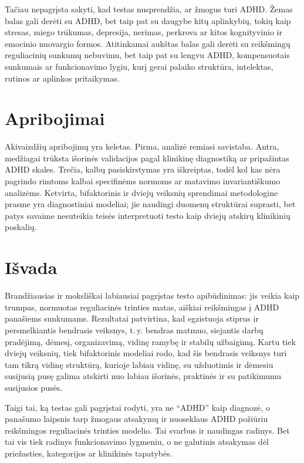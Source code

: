 \documentclass[11pt,a4paper]{article}
\begin{document}
Tačiau nepagrįsta sakyti, kad testas nusprendžia, ar žmogus turi ADHD. Žemas balas gali derėti su ADHD, bet taip pat su daugybe kitų aplinkybių, tokių kaip stresas, miego trūkumas, depresija, nerimas, perkrova ar kitos kognityvinio ir emocinio nuovargio formos. Atitinkamai aukštas balas gali derėti su reikšmingų reguliacinių sunkumų nebuvimu, bet taip pat su lengvu ADHD, kompensuotais sunkumais ar funkcionavimo lygiu, kurį gerai palaiko struktūra, intelektas, rutinos ar aplinkos pritaikymas.

\section{Apribojimai}
Akivaizdžių apribojimų yra keletas. Pirma, analizė remiasi savistaba. Antra, medžiagai trūksta išorinės validacijos pagal klinikinę diagnostiką ar pripažintas ADHD skales. Trečia, kalbų pasiskirstymas yra iškreiptas, todėl kol kas nėra pagrindo rimtoms kalbai specifinėms normoms ar matavimo invariantiškumo analizėms. Ketvirta, bifaktorinis ir dviejų veiksnių sprendimai metodologine prasme yra diagnostiniai modeliai; jie naudingi duomenų struktūrai suprasti, bet patys savaime nesuteikia teisės interpretuoti testo kaip dviejų atskirų klinikinių poskalių.

\section{Išvada}
Brandžiausias ir moksliškai labiausiai pagrįstas testo apibūdinimas: jis veikia kaip trumpas, normuotas reguliacinės trinties matas, aiškiai reikšmingas į ADHD panašiems sunkumams. Rezultatai patvirtina, kad egzistuoja stiprus ir persmelkiantis bendrasis veiksnys, t.\,y. bendras matmuo, siejantis darbų pradėjimą, dėmesį, organizavimą, vidinę ramybę ir stabilų užbaigimą. Kartu tiek dviejų veiksnių, tiek bifaktorinis modeliai rodo, kad šis bendrasis veiksnys turi tam tikrą vidinę struktūrą, kurioje labiau vidinę, su užduotimis ir dėmesiu susijusią pusę galima atskirti nuo labiau išorinės, praktinės ir su patikimumu susijusios pusės.

Taigi tai, ką testas gali pagrįstai rodyti, yra ne ``ADHD'' kaip diagnozė, o panašumo laipsnis tarp žmogaus atsakymų ir nuoseklaus ADHD požiūriu reikšmingos reguliacinės trinties modelio. Tai svarbus ir naudingas radinys. Bet tai vis tiek radinys funkcionavimo lygmeniu, o ne galutinis atsakymas dėl priežasties, kategorijos ar klinikinės tapatybės.

\printbibliography
\end{document}
